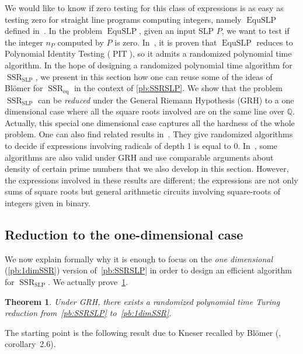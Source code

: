 \documentclass[a4paper, 11pt,dvipsnames]{article}
\newtheorem{theorem}{Theorem}
\newcommand{\SSReq}{\operatorname{SSR}_{\operatorname{eq}}}
\newcommand{\SSRslp}{\operatorname{SSR}_{\operatorname{SLP}}}
\newcommand{\equslp}{\operatorname{EquSLP}}
\newcommand{\pit}{\operatorname{PIT}}
\begin{document}
We would like to know if zero testing for this class of expressions is as easy as testing zero for straight line programs computing integers, namely $\equslp$
defined in~\cite{comp_num_analysis}. In the problem $\equslp$, given an input SLP $P$, we want to test if the integer $n_P$ computed by $P$ is zero. In~\cite{comp_num_analysis}, it is proven that $\equslp$ reduces to Polynomial Identity Testing ($\pit$), so it admits a
randomized polynomial time algorithm. In the hope of designing a randomized polynomial time algorithm for $\SSRslp$, we present in this section how one can
reuse some of the ideas of Bl{\"o}mer for $\SSReq$ in the context of \cref{pb:SSRSLP}. We show that the problem $\SSRslp$ can be \emph{reduced} under the
General Riemann Hypothesis (GRH) to a one dimensional case where all the square roots involved are on the same line over $\mathbb{Q}$. Actually, this special
one dimensional case captures all the hardness of the whole problem.  One can also find related results in~\cite{blomer1998probabilistic,balaji2022identity}.
They give randomized algorithms to decide if expressions involving radicals of depth 1 is equal to 0. In~\cite{balaji2022identity}, some algorithms are also
valid under GRH and use comparable arguments about density of certain prime numbers that we also develop in this section. However, the expressions involved in these
results are different; the expressions are not only sums of square roots but general arithmetic circuits involving square-roots of integers given in binary.

	\subsection{Reduction to the one-dimensional case}

			We now explain formally why it is enough to focus on the \emph{one dimensional} (\cref{pb:1dimSSR}) version of~\cref{pb:SSRSLP} in order to design an efficient
			algorithm for $\SSRslp$. We actually prove~\cref{thm:Turing_reduction}.

			\begin{theorem}
				\label{thm:Turing_reduction}
				Under GRH, there exists a randomized polynomial time Turing reduction from~\cref{pb:SSRSLP} to~\cref{pb:1dimSSR}.
			\end{theorem}

			The starting point is the following result due to Kneser \cite{Kneser1975} recalled by Bl{\"o}mer (\cite{blomer1993computing}, corollary~2.6).   
\end{document}
